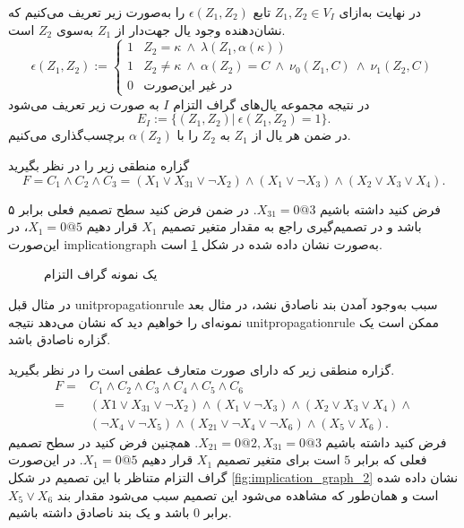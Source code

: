 در نهایت به‌ازای 
$Z_{1}, Z_{2}\in V_{I}$
تابع 
$\epsilon(Z_{1}, Z_{2})$
را به‌صورت زیر تعریف می‌کنیم  که نشان‌دهنده وجود یال جهت‌دار از 
$Z_{1}$
به‌سوی 
$Z_{2}$
است. 
\begin{equation*}
\epsilon(Z_{1}, Z_{2}):= \left\{
\begin{array}{ll}
1& Z_{2} = \kappa \ \wedge \ \lambda(Z_{1}, \alpha(\kappa))\\
1& Z_{2}\neq \kappa \ \wedge \ \alpha(Z_{2}) = C \ \wedge  \ \nu_{0}(Z_{1}, C) \ \wedge \ \nu_{1}(Z_{2}, C) \\
0 & \text{در غیر این‌صورت}
\end{array}
\right.
\end{equation*}
در نتیجه مجموعه یال‌های گراف التزام 
$I$
به صورت زیر تعریف می‌شود 
\begin{equation*}
E_{I}:= \{(Z_{1}, Z_{2})| \  \epsilon(Z_{1}, Z_{2}) = 1\}.
\end{equation*}
در ضمن هر یال  از 
$Z_{1}$
به 
$Z_{2}$
را با  
$\alpha(Z_{2})$
برچسب‌گذاری می‌کنیم. 
\begin{example}
گزاره منطقی زیر را در نظر بگیرید 
\begin{equation*}
F = C_{1}\wedge C_{2} \wedge C_{3} = (X_{1}\vee X_{31}\vee \neg X_{2})\wedge (X_{1}\vee \neg X_{3})\wedge (X_{2}\vee X_{3}\vee X_{4}).
\end{equation*}
\end{example}
فرض کنید داشته باشیم 
$X_{31} = 0@3$.
در ضمن فرض کنید سطح تصمیم فعلی برابر ۵ باشد  و  در تصمیم‌گیری راجع به مقدار متغیر تصمیم 
$X_{1}$
قرار دهیم 
$X_{1} = 0@5$، 
در این‌صورت  
\gls*{implicationgraph}
به‌صورت نشان داده شده در شکل 
\ref{fig:implication_graph_1}
است. 
\begin{figure}
	\centering
	
	\caption{یک نمونه گراف التزام}
	\label{fig:implication_graph_1}
\end{figure}
در مثال قبل 
\gls*{unitpropagationrule}
سبب به‌وجود آمدن بند ناصادق نشد، در  مثال بعد نمونه‌ای را خواهیم دید که  نشان می‌دهد  نتیجه 
\gls*{unitpropagationrule}
ممکن است یک گزاره ناصادق باشد. 
\begin{example}
\label{example:implication}
گزاره منطقی زیر که دارای صورت متعارف عطفی است را در  نظر بگیرید. 
\begin{align*}
F =& C_{1}\wedge C_{2}\wedge C_{3}\wedge C_{4}\wedge C_{5}\wedge C_{6}\\
=& (X{1}\vee X_{31}\vee \neg X_{2})\wedge (X_{1}\vee \neg X_{3})\wedge(X_{2}\vee X_{3}\vee X_{4})\wedge\\
&(\neg X_{4}\vee \neg X_{5})\wedge (X_{21}\vee \neg X_{4}\vee \neg X_{6})\wedge(X_{5}\vee X_{6}).
\end{align*}
فرض کنید داشته باشیم 
$X_{21} = 0@2, X_{31} = 0@3$. 
همچنین فرض کنید  در سطح تصمیم فعلی که برابر 
$5$
است  برای متغیر تصمیم 
$X_{1}$
قرار دهیم 
$X_{1} = 0@5$. 
در این‌صورت گراف التزام متناظر با این تصمیم در شکل 
\ref{fig:implication_graph_2}
نشان داده شده است و همان‌طور که مشاهده می‌شود این تصمیم  سبب می‌شود مقدار  بند 
$X_{5}\vee X_{6}$
برابر 
$0$
باشد و یک بند ناصادق داشته باشیم. 
\end{example}
